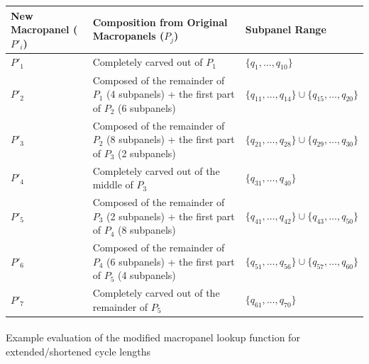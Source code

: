 \documentclass[
  number]{elsarticle}
\makeatletter
\let\oldparagraph\paragraph
\renewcommand{\paragraph}{
    \@ifstar
      \xxxParagraphStar
      \xxxParagraphNoStar
  }
\newcommand{\xxxParagraphStar}[1]{\oldparagraph*{#1}\mbox{}}
\newcommand{\xxxParagraphNoStar}[1]{\oldparagraph{#1}\mbox{}}
\newcounter{none} %
\makeatother
\begin{document}
{\def\LTcaptype{none} %
\begin{longtable}[]{@{}
  >{\raggedright\arraybackslash}p{}
  >{\raggedright\arraybackslash}p{}
  >{\raggedright\arraybackslash}p{}@{}}
\toprule\noalign{}
\begin{minipage}[b]{\linewidth}\raggedright
New Macropanel (\(P'_i\))
\end{minipage} & \begin{minipage}[b]{\linewidth}\raggedright
Composition from Original Macropanels (\(P_j\))
\end{minipage} & \begin{minipage}[b]{\linewidth}\raggedright
Subpanel Range
\end{minipage} \\
\midrule\noalign{}
\endhead
\bottomrule\noalign{}
\endlastfoot
\textbf{\(P'_1\)} & Completely carved out of \(P_1\) &
\(\{q_1, \dots, q_{10}\}\) \\
\textbf{\(P'_2\)} & Composed of the remainder of \(P_1\) (4 subpanels) +
the first part of \(P_2\) (6 subpanels) &
\(\{q_{11}, \dots, q_{14}\} \cup \{q_{15}, \dots, q_{20}\}\) \\
\textbf{\(P'_3\)} & Composed of the remainder of \(P_2\) (8 subpanels) +
the first part of \(P_3\) (2 subpanels) &
\(\{q_{21}, \dots, q_{28}\} \cup \{q_{29}, \dots, q_{30}\}\) \\
\textbf{\(P'_4\)} & Completely carved out of the middle of \(P_3\) &
\(\{q_{31}, \dots, q_{40}\}\) \\
\textbf{\(P'_5\)} & Composed of the remainder of \(P_3\) (2 subpanels) +
the first part of \(P_4\) (8 subpanels) &
\(\{q_{41}, \dots, q_{42}\} \cup \{q_{43}, \dots, q_{50}\}\) \\
\textbf{\(P'_6\)} & Composed of the remainder of \(P_4\) (6 subpanels) +
the first part of \(P_5\) (4 subpanels) &
\(\{q_{51}, \dots, q_{56}\} \cup \{q_{57}, \dots, q_{60}\}\) \\
\textbf{\(P'_7\)} & Completely carved out of the remainder of \(P_5\) &
\(\{q_{61}, \dots, q_{70}\}\) \\
\end{longtable}
}

\paragraph{Example evaluation of the modified macropanel lookup function
for extended/shortened cycle
lengths}\label{example-evaluation-of-the-modified-macropanel-lookup-function-for-extendedshortened-cycle-lengths}
\end{document}
